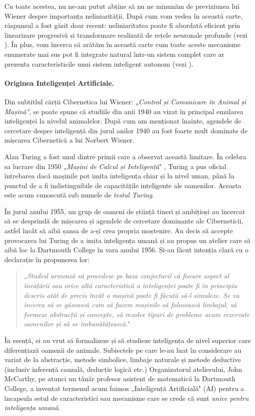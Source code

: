 \documentclass[../../book-main_ro.tex]{subfiles}
\begin{document}
Cu toate acestea, nu ne-am putut abține să nu ne minunăm de previziunea lui Wiener despre importanța neliniarității. După cum vom vedea în această carte, răspunsul a fost găsit doar recent: neliniaritatea poate fi abordată eficient prin linearizare progresivă și transformare realizată de rețele neuronale profunde (vezi ). În plus, vom încerca să arătăm în această carte cum toate aceste mecanisme enumerate mai sus pot fi integrate natural într-un sistem complet care ar prezenta caracteristicile unui sistem inteligent autonom (vezi ).

\paragraph{Originea Inteligenței Artificiale.}
Din subtitlul cărții Cibernetica lui Wiener: {\em „Control și Comunicare în Animal și Mașină"}, se poate spune că studiile din anii 1940 au vizat în principal emularea inteligenței la nivelul animalelor. După cum am menționat înainte, agendele de cercetare despre inteligență din jurul anilor 1940 au fost foarte mult dominate de mișcarea Cibernetică a lui Norbert Wiener.

Alan Turing a fost unul dintre primii care a observat această limitare. În celebra sa lucrare din 1950 „{\em Mașini de Calcul și Inteligență}" \cite{Turing-1950}, Turing a pus oficial întrebarea dacă mașinile pot imita inteligența chiar și la nivel uman, până la punctul de a fi indistinguibile de capacitățile inteligente ale oamenilor. Aceasta este acum cunoscută sub numele de {\em testul Turing}.

În jurul anului 1955, un grup de oameni de știință tineri și ambițioși au încercat să se desprindă de mișcarea și agendele de cercetare dominante ale Ciberneticii, astfel încât să aibă șansa de a-și crea propria moștenire. Au decis să accepte provocarea lui Turing de a imita inteligența umană și au propus un atelier care să aibă loc la Dartmouth College în vara anului 1956. Și-au făcut intenția clară cu o declarație în propunerea lor:
\begin{quote}
    „{\em Studiul urmează să procedeze pe baza conjecturii că fiecare aspect al învățării sau orice altă caracteristică a inteligenței poate fi în principiu descris atât de precis încât o mașină poate fi făcută să-l simuleze. Se va încerca să se găsească cum să facem mașinile să folosească limbajul, să formeze abstracții și concepte, să rezolve tipuri de probleme acum rezervate oamenilor și să se îmbunătățească}."
\end{quote}
În esență, ei au vrut să formalizeze și să studieze inteligența de nivel superior care diferențiază oamenii de animale. Subiectele pe care le-au luat în considerare au variat de la abstracție, metode simbolice, limbaje naturale și metode deductive (inclusiv inferență cauzală, deducție logică etc.) Organizatorul atelierului, John McCarthy, pe atunci un tânăr profesor asistent de matematică la Dartmouth College, a inventat termenul acum faimos „Inteligență Artificială" (AI) pentru a încapsula setul de caracteristici sau mecanisme care se crede că sunt {\em unice pentru inteligența umană}.
\end{document}
